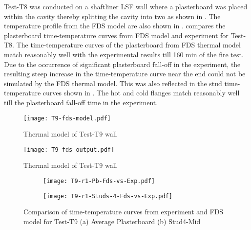 Test-T8 was conducted on a shaftliner LSF wall where a plasterboard was placed within the cavity thereby splitting the cavity into two as shown in . The temperature profile from the FDS model are also shown in .  compares the plasterboard time-temperature curves from FDS model and experiment for Test-T8. The time-temperature curves of the plasterboard from FDS thermal model match reasonably well with the experimental results till 160 min of the fire test. Due to the occurrence of significant plasterboard fall-off in the experiment, the resulting steep increase in the time-temperature curve near the end could not be simulated by the FDS thermal model. This was also reflected in the stud time-temperature curves shown in . The hot and cold flanges match reasonably well till the plasterboard fall-off time in the experiment.
\begin{figure}[!htbp]
	\centering
		\texttt{[image: T9-fds-model.pdf]}
		\caption{Thermal model of Test-T9 wall}
		\label{fig:T9-fds-model}
\end{figure}
\begin{figure}[!htbp]
	\centering
		\texttt{[image: T9-fds-output.pdf]}
		\caption{Thermal model of Test-T9 wall}
		\label{fig:T9-fds-model}
\end{figure}
\begin{figure}[!htbp]
	\centering
	\begin{subfigure}[b]{0.7\textwidth}
		\centering
		\texttt{[image: T9-r1-Pb-Fds-vs-Exp.pdf]}
		\caption{}
		\label{subfig:T9-r1-Pb-Fds-vs-Exp}
	\end{subfigure}
	\begin{subfigure}[b]{0.6\textwidth}
		\centering
		\texttt{[image: T9-r1-Studs-4-Fds-vs-Exp.pdf]}
		\caption{}
		\label{subfig:T9-r1-Studs-4-Fds-vs-Exp}
	\end{subfigure}
	   \caption{Comparison of time-temperature curves from experiment and FDS model for Test-T9 (a) Average Plasterboard (b) Stud4-Mid}
	   \label{fig:fds-output-pb-studs-t9}
\end{figure}

